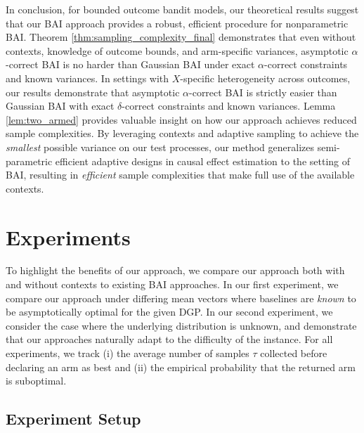 \documentclass{article}
\begin{document}
In conclusion, for bounded outcome bandit models, our theoretical results suggest that our BAI approach provides a robust, efficient procedure for nonparametric BAI. Theorem \ref{thm:sampling_complexity_final} demonstrates that even without contexts, knowledge of outcome bounds, and arm-specific variances, asymptotic $\alpha$-correct BAI is no harder than Gaussian BAI under exact $\alpha$-correct constraints and known variances. In settings with $X$-specific heterogeneity across outcomes, our results demonstrate that asymptotic $\alpha$-correct BAI is strictly easier than Gaussian BAI with exact $\delta$-correct constraints and known variances. Lemma \ref{lem:two_armed} provides valuable insight on how our approach achieves reduced sample complexities. By leveraging contexts and adaptive sampling to achieve the \textit{smallest} possible variance on our test processes, our method generalizes semi-parametric efficient adaptive designs in causal effect estimation to the setting of BAI, resulting in \textit{efficient} sample complexities that make full use of the available contexts.


\section{Experiments}\label{sec:experiments}

To highlight the benefits of our approach, we compare our approach both with and without contexts to existing BAI approaches. In our first experiment, we compare our approach under differing mean vectors where baselines are \textit{known} to be asymptotically optimal for the given DGP. In our second experiment, we consider the case where the underlying distribution is unknown, and demonstrate that our approaches naturally adapt to the difficulty of the instance. For all experiments, we track (i) the average number of samples $\tau$ collected before declaring an arm as best and (ii) the empirical probability that the returned arm is suboptimal. %

\subsection{Experiment Setup}
\end{document}
